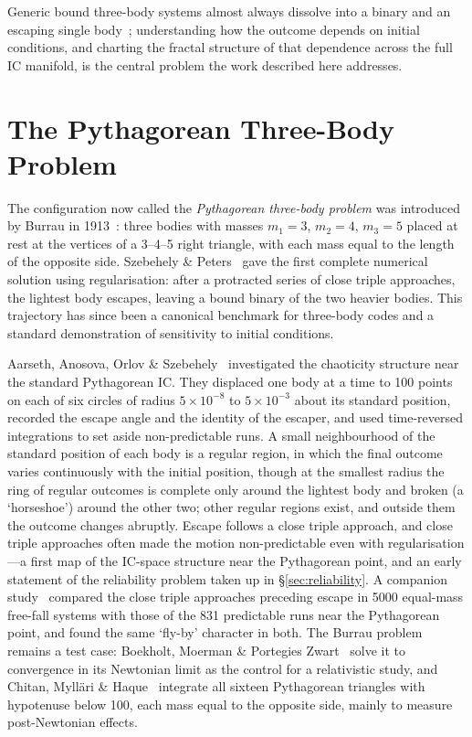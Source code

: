 \documentclass[11pt,a4paper]{article}
\begin{document}
Generic bound three-body systems almost always dissolve into a binary and an escaping single
body~\cite{heggie2003}; understanding how the outcome depends on initial conditions, and charting
the fractal structure of that dependence across the full IC manifold, is the central problem the
work described here addresses.

\section{The Pythagorean Three-Body Problem}

The configuration now called the \emph{Pythagorean three-body problem} was introduced by
Burrau in 1913~\cite{burrau1913}: three bodies with masses $m_1=3$, $m_2=4$, $m_3=5$ placed
at rest at the vertices of a 3--4--5 right triangle, with each mass equal to the length of the
opposite side.  Szebehely \& Peters~\cite{szebehely1967} gave the first complete numerical
solution using regularisation: after a protracted series of close triple approaches, the
lightest body escapes, leaving a bound binary of the two heavier bodies.  This trajectory has
since been a canonical benchmark for three-body codes and a standard demonstration of
sensitivity to initial conditions.

Aarseth, Anosova, Orlov \& Szebehely~\cite{aarseth1994} investigated the chaoticity structure
near the standard Pythagorean IC.  They displaced one body at a time to 100 points on each of six
circles of radius $5 \times 10^{-8}$ to $5 \times 10^{-3}$ about its standard position, recorded
the escape angle and the identity of the escaper, and used time-reversed integrations to set
aside non-predictable runs.  A small neighbourhood of the standard position of each body is a
regular region, in which the final outcome varies continuously with the initial position, though at
the smallest radius the ring of regular outcomes is complete only around the lightest body and
broken (a `horseshoe') around the other two; other
regular regions exist, and outside them the outcome changes abruptly.  Escape follows a close
triple approach, and close triple approaches often made the motion non-predictable even with
regularisation---a first map of the IC-space structure near the Pythagorean point, and an early
statement of the reliability problem taken up in \S\ref{sec:reliability}.  A companion
study~\cite{aarseth1994b} compared the close triple approaches preceding escape in 5000 equal-mass
free-fall systems with those of the 831 predictable runs near the Pythagorean point, and found the
same `fly-by' character in both.  The Burrau problem
remains a test case: Boekholt, Moerman \& Portegies Zwart~\cite{boekholt2021} solve it to
convergence in its Newtonian limit as the control for a relativistic study, and Chitan, Myll\"{a}ri
\& Haque~\cite{chitan2022} integrate all sixteen Pythagorean triangles with hypotenuse below 100,
each mass equal to the opposite side, mainly to measure post-Newtonian effects.
\end{document}
